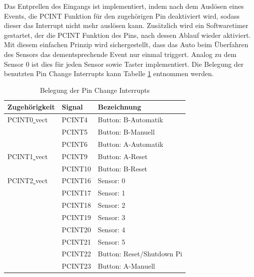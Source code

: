 \documentclass[a4paper, 11pt]{report}
\begin{document}
			Das Entprellen des Eingangs ist implementiert, indem nach dem Auslösen eines Events, die PCINT Funktion für den zugehörigen Pin deaktiviert wird, sodass dieser das Interrupt nicht mehr auslösen kann. Zusätzlich wird ein Softwaretimer gestartet, der die PCINT Funktion des Pins, nach dessen Ablauf wieder aktiviert. Mit diesem einfachen Prinzip wird sichergestellt, dass das Auto beim Überfahren des Sensors das dementsprechende Event nur einmal triggert.
			Analog zu dem Sensor 0 ist dies für jeden Sensor sowie Taster implementiert. Die Belegung der benutzten Pin Change Interrupts kann Tabelle \ref{tab:belegungpcint} entnommen werden.
			\begin{table}[ht]
				\caption{Belegung der Pin Change Interrupts}
				\begin{tabular}{|l|l|l|}
					\hline
					Zugehörigkeit & Signal & Bezeichnung\\
					\hline
					\hline
					PCINT0\underline{ }vect & PCINT4 & Button: B-Automatik\\
					\hline
											& PCINT5 & Button: B-Manuell\\
					\hline
											& PCINT6 & Button: A-Automatik\\
					\hline
					\hline
					PCINT1\underline{ }vect & PCINT9 & Button: A-Reset\\
					\hline
											& PCINT10 & Button: B-Reset\\
					\hline
					\hline
					PCINT2\underline{ }vect & PCINT16 & Sensor: 0\\
					\hline
											& PCINT17 & Sensor: 1\\
					\hline
											& PCINT18 & Sensor: 2\\
					\hline
											& PCINT19 & Sensor: 3\\
					\hline
											& PCINT20 & Sensor: 4\\
					\hline
											& PCINT21 & Sensor: 5\\
					\hline
											& PCINT22 & Button: Reset/Shutdown Pi\\
					\hline
											& PCINT23 & Button: A-Manuell\\
					\hline
				\end{tabular}
				\label{tab:belegungpcint}
			\end{table}
\end{document}
